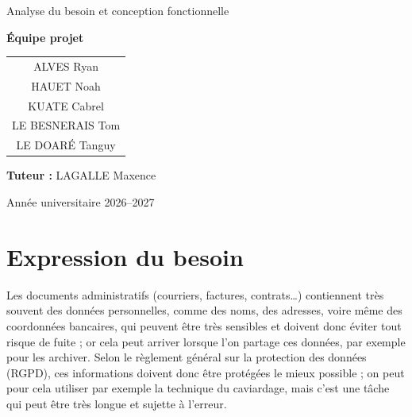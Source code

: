 \documentclass[12pt,a4paper]{article}
\begin{document}
\begin{titlepage}
\begin{center}
{\large
Analyse du besoin et conception fonctionnelle
}

\vfill


\begin{minipage}{0.75\textwidth}

\centering

{\large \textbf{Équipe projet}}

\vspace{0.5cm}

\begin{tabular}{c}
ALVES Ryan \\[0.2cm]
HAUET Noah \\[0.2cm]
KUATE Cabrel\\[0.2cm]
LE BESNERAIS Tom \\[0.2cm]
LE DOARÉ Tanguy
\end{tabular}

\vspace{1cm}

{\large
\textbf{Tuteur :} LAGALLE Maxence
}

\end{minipage}

\vfill


{\large
Année universitaire 2026--2027
}

\vspace{0.3cm}


\end{center}

\end{titlepage}


\tableofcontents
\newpage

\section{Expression du besoin}

Les documents administratifs (courriers, factures, contrats…) contiennent très souvent des données personnelles, comme des noms, des adresses, voire même des coordonnées bancaires, qui peuvent être très sensibles et doivent donc éviter tout risque de fuite ; or cela peut arriver lorsque l’on partage ces données, par exemple pour les archiver. Selon le règlement général sur la protection des données (RGPD), ces informations doivent donc être protégées le mieux possible ; on peut pour cela utiliser par exemple la technique du caviardage, mais c’est une tâche qui peut être très longue et sujette à l’erreur.
\end{document}
